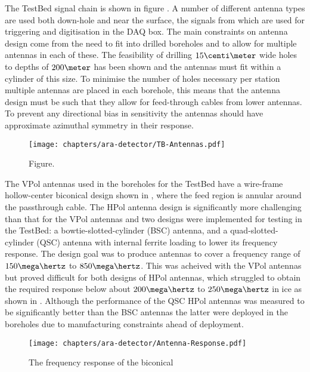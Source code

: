 The TestBed signal chain is shown in figure . A number of different antenna types are used both down-hole and near the surface, the signals from which are used for triggering and digitisation in the DAQ box. The main constraints on antenna design come from the need to fit into drilled boreholes and to allow for multiple antennas in each of these. The feasibility of drilling $15 \centi\meter$ wide holes to depths of $200 \meter$ has been shown and the antennas must fit within a cylinder of this size. To minimise the number of holes necessary per station multiple antennas are placed in each borehole, this means that the antenna design must be such that they allow for feed-through cables from lower antennas. To prevent any directional bias in sensitivity the antennas should have approximate azimuthal symmetry in their response. 

\begin{figure}[htpb]
  \centering
  \texttt{[image: chapters/ara-detector/TB-Antennas.pdf]}
  \caption{Figure.}
  \label{fig:ara-detector:TestBed:Antennas}
\end{figure}

The VPol antennas used in the boreholes for the TestBed have a wire-frame hollow-center biconical design shown in , where the feed region is annular around the passthrough cable. The HPol antenna design is significantly more challenging than that for the VPol antennas and two designs were implemented for testing in the TestBed: a bowtie-slotted-cylinder (BSC) antenna, and a quad-slotted-cylinder (QSC) antenna with internal ferrite loading to lower its frequency response. The design goal was to produce antennas to cover a frequency range of $150 \mega \hertz$ to $850 \mega \hertz$. This was acheived with the VPol antennas but proved difficult for both designs of HPol antennas, which struggled to obtain the required response below about $200 \mega \hertz$ to $250 \mega \hertz$ in ice as shown in . Although the performance of the QSC HPol antennas was measured to be significantly better than the BSC antennas the latter were deployed in the boreholes due to manufacturing constraints ahead of deployment.

\begin{figure}[htpb]
  \centering
  \texttt{[image: chapters/ara-detector/Antenna-Response.pdf]}
  \caption{The frequency response of the biconical }
  \label{fig:ara-detector:TestBed:Signal-Chain:Frequency-Response}
\end{figure}



